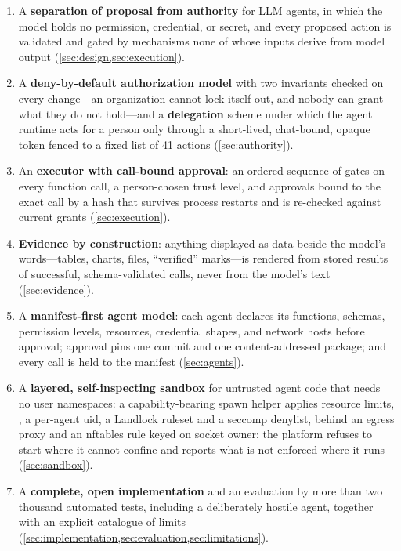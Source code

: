 \begin{enumerate}[label=(\arabic*),leftmargin=1.6em]
\item A \textbf{separation of proposal from authority} for LLM agents,
  in which the model holds no permission, credential, or secret, and
  every proposed action is validated and gated by mechanisms none of
  whose inputs derive from model output (\cref{sec:design,sec:execution}).
\item A \textbf{deny-by-default authorization model} with two
  invariants checked on every change---an organization cannot lock
  itself out, and nobody can grant what they do not hold---and a
  \textbf{delegation} scheme under which the agent runtime acts for a
  person only through a short-lived, chat-bound, opaque token fenced to
  a fixed list of 41 actions (\cref{sec:authority}).
\item An \textbf{executor with call-bound approval}: an ordered
  sequence of gates on every function call, a person-chosen trust
  level, and approvals bound to the exact call by a hash that survives
  process restarts and is re-checked against current grants
  (\cref{sec:execution}).
\item \textbf{Evidence by construction}: anything displayed as data
  beside the model's words---tables, charts, files, ``verified''
  marks---is rendered from stored results of successful, schema-validated
  calls, never from the model's text (\cref{sec:evidence}).
\item A \textbf{manifest-first agent model}: each agent declares its
  functions, schemas, permission levels, resources, credential shapes,
  and network hosts before approval; approval pins one commit and one
  content-addressed package; and every call is held to the manifest
  (\cref{sec:agents}).
\item A \textbf{layered, self-inspecting sandbox} for untrusted agent
  code that needs no user namespaces: a capability-bearing spawn helper
  applies resource limits, , a per-agent uid, a
  Landlock ruleset and a seccomp denylist, behind an egress proxy and
  an nftables rule keyed on socket owner; the platform refuses to start
  where it cannot confine and reports what is not enforced where it
  runs (\cref{sec:sandbox}).
\item A \textbf{complete, open implementation} and an evaluation by
  more than two thousand automated tests, including a deliberately
  hostile agent, together with an explicit catalogue of limits
  (\cref{sec:implementation,sec:evaluation,sec:limitations}).
\end{enumerate}

